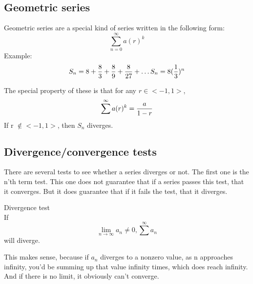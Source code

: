 \documentclass[17pt]{extarticle} %
\begin{document}
\subsection{Geometric series}
Geometric series are a special kind of series written in the following form:
$$
\sum^\infty_{n=0} a(r)^k
$$
Example: 
$$
S_n = 8 + {8 \over 3} + {8 \over 9} + {8 \over 27} + \ldots \\
S_n = 8 ({1\over 3})^n
$$

The special property of these is that for any $r \in <-1, 1>$, 
$$
\sum^\infty a(r)^k = {a \over 1 - r}
$$
If r $\not\in <-1, 1>$, then $S_n$ diverges.


\subsection{Divergence/convergence tests}
There are several tests to see whether a series diverges or not. 
The first one is the n'th term test. This one does not guarantee that if a series passes this test, that it converges.
But it does guarantee that if it fails the test, that it diverges.

\begin{theorem*}{Divergence test} \\
    If
    $$
    \lim_{n \to \infty} a_n \neq 0, 
     \sum^\infty a_n 
    $$ 
    will diverge.
\end{theorem*}
This makes sense, because if $a_n$ diverges to a nonzero value, as n approaches infinity, you'd be summing up that value infinity times, 
which does reach infinity. And if there is no limit, it obviously can't converge.
\end{document}

